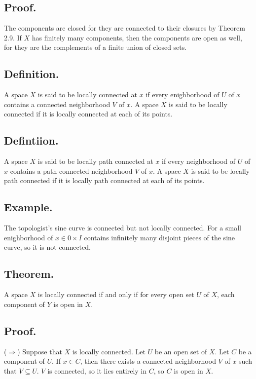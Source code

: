\documentclass[titlepage]{article}
\begin{document}
\subsection{Proof.} The components are closed for they are connected to their closures by Theorem 2.9. If $X$ has finitely many components, then the components are open as well, for they are the complements of a finite union of closed sets.

\subsection{Definition.} A space $X$ is said to be locally connected at $x$ if every enighborhood of $U$ of $x$ contains a connected neighborhood $V$ of $x$. A space $X$ is said to be locally connected if it is locally connected at each of its points.

\subsection{Defintiion.} A space $X$ is said to be locally path connected at $x$ if every neighborhood of $U$ of $x$ contains a path connected neighborhood $V$ of $x$. A space $X$ is said to be locally path connected if it is locally path connected at each of its points.

\subsection{Example.} The topologist's sine curve is connected but not locally connected. For a small enighborhood of $x \in 0 \times I$ contains infinitely many disjoint pieces of the sine curve, so it is not connected.

\subsection{Theorem.} A space $X$ is locally connected if and only if for every open set $U$ of $X$, each component of $Y$ is open in $X$.

\subsection{Proof.}

($\Rightarrow$) Suppose that $X$ is locally connected. Let $U$ be an open set of $X$. Let $C$ be a component of $U$. If $x \in C$, then there exists a connected neighborhood $V$ of $x$ such that $V \subseteq U$. $V$ is connected, so it lies entirely in $C$, so $C$ is open in $X$.
\end{document}

